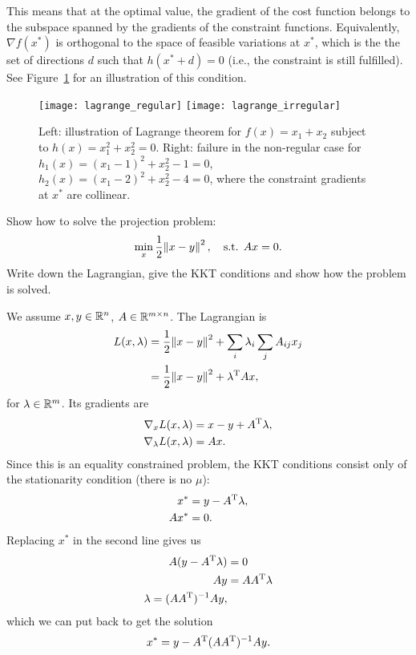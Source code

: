 \documentclass{article}
\begin{document}
This means that at the optimal value, the gradient of the cost function belongs to the subspace
spanned by the gradients of the constraint functions.  Equivalently, \(\nabla f(x^*)\) is orthogonal
to the space of feasible variations at \(x^*\), which is the the set of directions \(d\) such that
\(h(x^* + d) = 0\) (i.e., the constraint is still fulfilled).  See Figure~\ref{fig:lagrange} for an
illustration of this condition.

\begin{figure}
  \centering
  \texttt{[image: lagrange\_regular]}
  \hspace{1em}
  \texttt{[image: lagrange\_irregular]}
  \caption{Left: illustration of Lagrange theorem for \(f(x) = x_1 + x_2\) subject to
    \(h(x) = x_1^2 + x_2^2 = 0\).  Right: failure in the non-regular case for
    \(h_1(x) = (x_1 - 1)^2 + x_2^2 - 1 = 0\), \(h_2(x) = (x_1 - 2)^2 + x_2^2 - 4 = 0\), where the
    constraint gradients at \(x^*\) are collinear.\label{fig:lagrange}}
\end{figure}


\begin{question}
  Show how to solve the projection problem:
  \begin{equation*}
    \min_x \frac{1}{2} \enVert{x - y}^2, \quad\text{s.t. } Ax = 0.
  \end{equation*}
  Write down the Lagrangian, give the KKT conditions and show how the problem is solved.
\end{question}

We assume \(x, y \in \mathbb{R}^n\), \(A \in \mathbb{R}^{m \times n}\). The Lagrangian is
\begin{align*}
  L(x, \lambda) &= \frac{1}{2} \enVert{x - y}^2 + \sum_i \lambda_i \sum_j A_{ij} x_j \\
                &= \frac{1}{2} \enVert{x - y}^2 + \T{\lambda} A x,
\end{align*}
for \(\lambda \in \mathbb{R}^m\). Its gradients are
\begin{align*}
  \nabla_x L(x, \lambda) &= x - y + A^{\mathrm{T}} \lambda, \\
  \nabla_\lambda L(x, \lambda) &= A x.
\end{align*}
Since this is an equality constrained problem, the KKT conditions consist only of the stationarity
condition (there is no \(\mu\)):
\begin{align*}
  x^* &= y - A^{\mathrm{T}} \lambda, \\
  A x^* &= 0.
\end{align*}
Replacing \(x^*\) in the second line gives us
\begin{align*}
  A(y - A^{\mathrm{T}} \lambda) &= 0 \\
  Ay &= A A^{\mathrm{T}} \lambda \\
  \lambda = (A A^{\mathrm{T}})^{-1} A y,
\end{align*}
which we can put back to get the solution
\begin{equation*}
  x^* = y - A^{\mathrm{T}} (A A^{\mathrm{T}})^{-1} A y.
\end{equation*}
\end{document}
